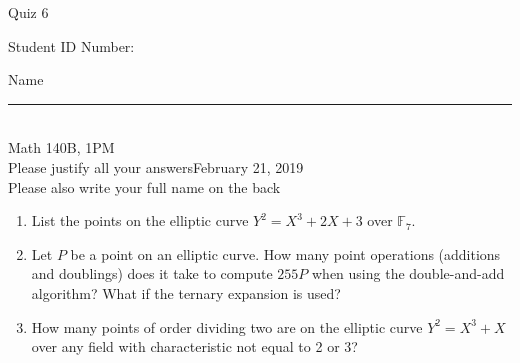 \documentclass[12pt]{article}
\begin{document}
\begin{flushleft} 
\centerline{\LARGE{Quiz 6}} 
\vspace{5 mm}
{Student ID Number:}\hfill  
{Name \rule {2 in}{0.01in}}\\
Math 140B, 1PM
\\
{Please justify all your answers}\hfill {February 21, 2019}
\\
{Please also write your full name on the back} 

\medskip
\end{flushleft}

\begin{enumerate}
	\item List the points on the elliptic curve $Y^2 = X^3 + 2X + 3$ over $\mathbb{F}_7$.
	\vfill
	\item Let $P$ be a point on an elliptic curve. How many point operations (additions and doublings) does it take to compute $255P$ when using the double-and-add algorithm? What if the ternary expansion is used?
	\vfill
	\item How many points of order dividing two are on the elliptic curve $Y^2 = X^3 + X$ over any field with characteristic not equal to 2 or 3?
	\vfill 
\end{enumerate}

\end{document}

